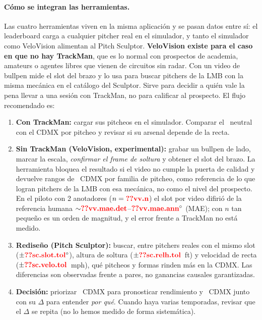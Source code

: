 \documentclass[10pt]{article}
\begin{document}
\paragraph{Cómo se integran las herramientas.} Las cuatro herramientas viven en la misma aplicación y se pasan datos entre sí: el leaderboard carga a cualquier pitcher real en el simulador, y tanto el simulador como VeloVision alimentan al Pitch Sculptor. \textbf{VeloVision existe para el caso en que no hay TrackMan}, que es lo normal con prospectos de academia, amateurs o agentes libres que vienen de circuitos sin radar. Con un video de bullpen mide el slot del brazo y lo usa para buscar pitchers de la LMB con la misma mecánica en el catálogo del Sculptor. Sirve para decidir a quién vale la pena llevar a una sesión con TrackMan, no para calificar al prospecto. El flujo recomendado es:

\begin{enumerate}
  \item \textbf{Con TrackMan:} cargar sus pitcheos en el simulador. Comparar el \splus\ neutral con el CDMX por pitcheo y revisar si su arsenal depende de la recta.
  \item \textbf{Sin TrackMan (VeloVision, experimental):} grabar un bullpen de lado, marcar la escala, \emph{confirmar el frame de soltura} y obtener el slot del brazo. La herramienta bloquea el resultado si el video no cumple la puerta de calidad y devuelve rangos de \splus\ CDMX por familia de pitcheo, como referencia de lo que logran pitchers de la LMB con esa mecánica, no como el nivel del prospecto. En el piloto con 2 anotadores ($n=\cf{vv.n}$) el slot por video difirió de la referencia humana ${\sim}\cf{vv.mae.det}$--$\cf{vv.mae.ann}^\circ$ (MAE); con $n$ tan pequeño es un orden de magnitud, y el error frente a TrackMan no está medido.
  \item \textbf{Rediseño (Pitch Sculptor):} buscar, entre pitchers reales con el mismo slot ($\pm\cf{sc.slot.tol}^\circ$), altura de soltura ($\pm\cf{sc.relh.tol}$~ft) y velocidad de recta ($\pm\cf{sc.velo.tol}$~mph), qué pitcheos y formas rinden más en la CDMX. Las diferencias son observadas frente a pares, no ganancias causales garantizadas.
  \item \textbf{Decisión:} priorizar \pplus\ CDMX para pronosticar rendimiento y \splus\ CDMX junto con su $\Delta$ para entender \emph{por qué}. Cuando haya varias temporadas, revisar que el $\Delta$ se repita (no lo hemos medido de forma sistemática).
\end{enumerate}
\end{document}
